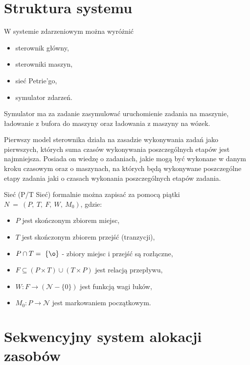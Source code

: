 \documentclass[10pt, a4paper]{article}
\begin{document}
\section{Struktura systemu}

W systemie zdarzeniowym można wyróżnić
\begin{itemize}
\item sterownik główny,
\item sterowniki maszyn,
\item sieć Petrie'go,
\item symulator zdarzeń.
\end{itemize}

Symulator ma za zadanie zasymulować uruchomienie zadania na maszynie, ładowanie z bufora do maszyny oraz ładowania z maszyny na wózek.

Pierwszy model sterownika działa na zasadzie wykonywania zadań jako pierwszych, których suma czasów wykonywania poszczególnych etapów jest najmniejsza. Posiada on wiedzę o zadaniach, jakie mogą być wykonane w danym kroku czasowym oraz o maszynach, na których będą wykonywane poszczególne etapy zadania jaki o czasach wykonania poszczególnych etapów zadania.


Sieć (P/T Sieć) formalnie można zapisać za pomocą piątki $N\ =\ (P,\ T,\ F,\ W,\ M_0)$, gdzie:
\begin{itemize}
\item $P$ jest skończonym zbiorem miejsc,
\item $T$ jest skończonym zbiorem przejść (tranzycji),
\item $P \cap T =\ \{\o \}$ - zbiory miejsc i przejść są rozłączne,
\item $F \subseteq (P\times T)\cup (T\times P)$ jest relacją przepływu,
\item $W:F\to (\mathcal{N}-\{0\})$ jest funkcją wagi łuków,
\item $M_0:P  \to \mathcal{N}$ jest markowaniem początkowym.
\end{itemize}
\section{Sekwencyjny system alokacji zasobów}
\end{document}

